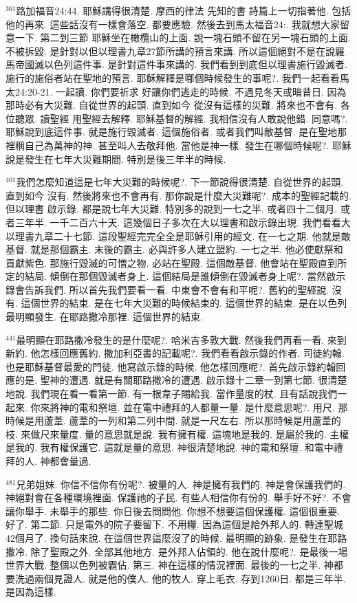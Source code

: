 \documentclass{book}
\begin{document}
$^{361}$路加福音24:44.
耶穌講得很清楚.
摩西的律法 先知的書 詩篇上一切指著他.
包括他的再來.
這些話沒有一樣會落空.
都要應驗.
然後去到馬太福音24:.
我就想大家留意一下.
第二到三節 耶穌坐在橄欖山的上面.
說一塊石頭不留在另一塊石頭的上面.
不被拆毀.
是針對以但以理書九章27節所講的預言來講.
所以這個絕對不是在說羅馬帝國滅以色列這件事.
是針對這件事來講的.
我們看到到底但以理書施行毀滅者.
施行的施俗者站在聖地的預言.
耶穌解釋是哪個時候發生的事呢?.
我們一起看看馬太24:20-21.
一起讀.
你們要祈求 好讓你們逃走的時候.
不遇見冬天或暗昔日.
因為那時必有大災難.
自從世界的起頭.
直到如今 從沒有這樣的災難.
將來也不會有.
各位聽眾.
讀聖經 用聖經去解釋.
耶穌基督的解經.
我相信沒有人敢說他錯.
同意嗎?.
耶穌說到底這件事.
就是施行毀滅者.
這個施俗者.
或者我們叫敵基督.
是在聖地那裡稱自己為萬神的神.
甚至叫人去敬拜他.
當他是神一樣.
發生在哪個時候呢?.
耶穌說是發生在七年大災難期間.
特別是後三年半的時候.

$^{401}$我們怎麼知道這是七年大災難的時候呢?.
下一節說得很清楚.
自從世界的起頭.
直到如今 沒有.
然後將來也不會再有.
那你說是什麼大災難呢?.
成本的聖經記載的.
但以理書 啟示錄.
都是說七年大災難.
特別多的說到一七之半.
或者四十二個月.
或者三年半.
一千二百六十天.
這幾個日子多次在大以理書和啟示錄出現.
我們看看大以理書九章二十七節.
這段聖經完完全全是耶穌引用的經文.
在一七之期.
他就是敵基督.
就是那個霸主.
末後的霸主.
必與許多人建立盟約.
一七之半.
他必使獻祭和貢獻紫色.
那施行毀滅的可憎之物.
必站在聖殿.
這個敵基督.
他會站在聖殿直到所定的結局.
傾倒在那個毀滅者身上.
這個結局是誰傾倒在毀滅者身上呢?.
當然啟示錄會告訴我們.
所以首先我們要看一看.
中東會不會有和平呢?.
舊約的聖經說.
沒有.
這個世界的結束.
是在七年大災難的時候結束的.
這個世界的結束.
是在以色列最明顯發生.
在耶路撒冷那裡.
這個世界的結束.

$^{441}$最明顯在耶路撒冷發生的是什麼呢?.
哈米吉多敦大戰.
然後我們再看一看.
來到新約.
他怎樣回應舊約.
撒加利亞書的記載呢?.
我們看看啟示錄的作者.
司徒約翰.
也是耶穌基督最愛的門徒.
他寫啟示錄的時候.
他怎樣回應呢?.
首先啟示錄約翰回應的是.
聖神的遭遇.
就是有關耶路撒冷的遭遇.
啟示錄十二章一到第七節.
很清楚地說.
我們現在看一看第一節.
有一根韋子賜給我.
當作量度的杖.
且有話說我們一起來.
你來將神的電和祭壇.
並在電中禮拜的人都量一量.
是什麼意思呢?.
用尺.
那時候是用蘆葦.
蘆葦的一列和第二列中間.
就是一尺左右.
所以那時候是用蘆葦的枝.
來做尺來量度.
量的意思就是說.
我有擁有權.
這塊地是我的.
是屬於我的.
主權是我的.
我有權保護它.
這就是量的意思.
神很清楚地說.
神的電和祭壇.
和電中禮拜的人.
神都會量過.

$^{481}$兄弟姐妹.
你信不信你有份呢?.
被量的人.
神是擁有我們的.
神是會保護我們的.
神絕對會在各種環境裡面.
保護祂的子民.
有些人相信你有份的.
舉手好不好?.
不會讓你舉手.
未舉手的那些.
你日後去問問他.
你想不想要這個保護權.
這個很重要.
好了.
第二節.
只是電外的院子要留下.
不用糧.
因為這個是給外邦人的.
轉達聖城42個月了.
換句話來說.
在這個世界這麼沒了的時候.
最明顯的跡象.
是發生在耶路撒冷.
除了聖殿之外.
全部其他地方.
是外邦人佔領的.
他在說什麼呢?.
是最後一場世界大戰.
整個以色列被霸佔.
第三.
神在這樣的情況裡面.
最後的一七之半.
神都要洗過兩個見證人.
就是他的僕人.
他的牧人.
穿上毛衣.
存到1260日.
都是三年半.
是因為這樣.
\end{document}
